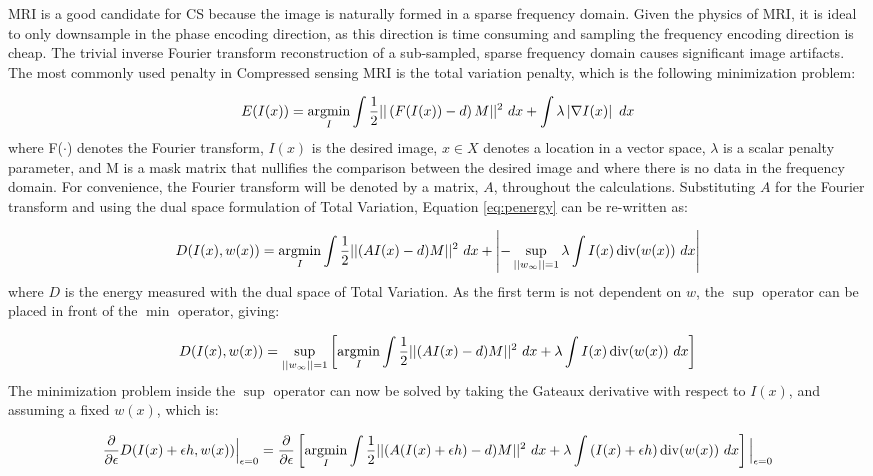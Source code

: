 MRI is a good candidate for CS because the image is naturally formed in a sparse frequency domain. Given the physics of MRI, it is ideal to only downsample in the phase encoding direction, as this direction is time consuming and sampling the frequency encoding direction is cheap.  The trivial inverse Fourier transform reconstruction of a sub-sampled, sparse frequency domain causes significant image artifacts. The most commonly used penalty in Compressed sensing MRI is the total variation penalty, which is the following minimization problem:

\begin{equation}
E(I(x)) = \operatorname*{argmin}_I \int{}\frac{1}{2}||\left(F(I(x)) - d\right)M||^{2} \ dx + \int{}\lambda{}\left|\nabla{}I(x)\right| \ dx \label{eq:penergy}
\end{equation}
where F($\cdot{}$) denotes the Fourier transform, $I(x)$ is the desired image, $x\in{}X$ denotes a location in a vector space, $\lambda{}$ is a scalar penalty parameter, and M is a mask matrix that nullifies the comparison between the desired image and where there is no data in the frequency domain. For convenience, the Fourier transform will be denoted by a matrix, $A$, throughout the calculations. Substituting $A$ for the Fourier transform and using the dual space formulation of Total Variation, Equation \ref{eq:penergy} can be re-written as:


\begin{equation}
D(I(x),w(x)) = \operatorname*{argmin}_I  \int{}\frac{1}{2}||(AI(x) - d)M||^{2} \ dx + \left|-\sup_{||{w}_{\infty}||=1}\lambda{}\int{}I(x)\operatorname{div}(w(x)) \ dx\right|
\end{equation}
where $D$ is the energy measured with the dual space of Total Variation. As the first term is not dependent on $w$, the $\sup$ operator can be placed in front of the $\min$ operator, giving: 

\begin{equation}
D(I(x),w(x)) = \sup_{||{w}_{\infty}||=1}\left[\argmin_I  \int{}\frac{1}{2}||(AI(x) - d)M||^{2} \ dx + \lambda{}\int{}I(x)\operatorname{div}(w(x)) \ dx\right]\label{eq:duale}
\end{equation}
The minimization problem inside the $\sup$ operator can now be solved by taking the Gateaux derivative with respect to $I(x)$, and assuming a fixed $w(x)$, which is:

\begin{equation}
\frac{\partial{}}{\partial{}\epsilon{}}D(I(x)+\epsilon{}h,w(x))\Big|_{\epsilon=0} = \frac{\partial{}}{\partial{}\epsilon{}}\left[\argmin_I  \int{}\frac{1}{2}||(A(I(x)+\epsilon{}h) - d)M||^{2} \ dx + \lambda{}\int{}(I(x)+\epsilon{}h)\operatorname{div}(w(x)) \ dx\right]\Big|_{\epsilon=0}
\end{equation}

